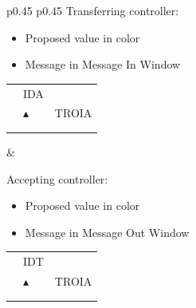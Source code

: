 \documentclass[a4paper,oneside,11pt]{memoir}
\begin{document}
\begin{longtable}{p{} p{}}
  Transferring controller:

  \begin{itemize}
    \item Proposed value in  color
    \item Message in Message In Window
  \end{itemize}

  \begin{tabular}{
    >{\columncolor{Flight Highlight}}l 
    >{\columncolor{Flight Highlight}}l
    >{\columncolor{Flight Highlight}}l }
    {\color{Assumed} ABC123} & {\color{Coordination} IDA}       & {\color{Assumed} }      \\
    {\color{Assumed} 100}    & {\color{Assumed} $\blacktriangle$} & {\color{Assumed} TROIA} \\
    {\color{Assumed} 180}    & {\color{Assumed} }          & {\color{Assumed} } \\
    {\color{Negotiation In} H360}    & {\color{Assumed} }          & {\color{Assumed} }  \\         
  \end{tabular}

  &
 
  Accepting controller:

  \begin{itemize}
    \item Proposed value in  color
    \item Message in Message Out Window
  \end{itemize}

  \begin{tabular}{
    >{\columncolor{Flight Highlight}}l 
    >{\columncolor{Flight Highlight}}l
    >{\columncolor{Flight Highlight}}l }
    {\color{Coordination} ABC123} & {\color{Coordination} IDT}       & {\color{Coordination} }      \\
    {\color{Coordination} 100}    & {\color{Coordination} $\blacktriangle$} & {\color{Coordination} TROIA} \\
    {\color{Coordination} 180}    & {\color{Coordination} }          & {\color{Coordination} } \\
    {\color{Negotiation Out} H360}    & {\color{Coordination} }          & {\color{Coordination} }  \\        
  \end{tabular}
\end{longtable}
\end{document}
